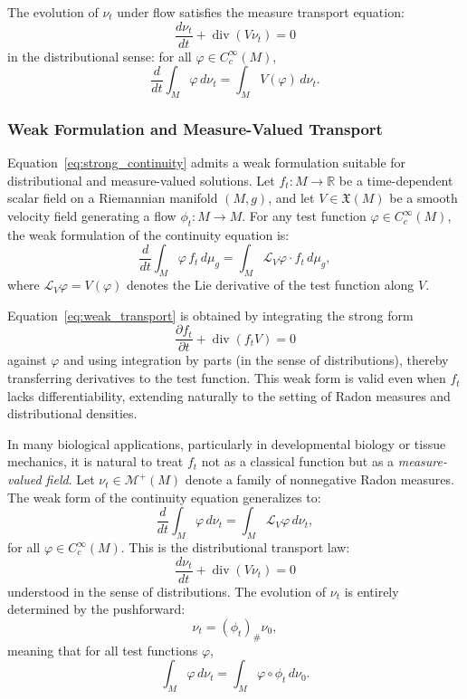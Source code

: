 \begin{definition}
The evolution of $\nu_t$ under flow satisfies the measure transport equation:
\begin{equation}
\label{eq:measure_transport_equation}
\frac{d\nu_t}{dt} + \operatorname{div}(V \nu_t) = 0
\end{equation}
in the distributional sense: for all $\varphi \in C_c^\infty(M)$,
\begin{equation}
\frac{d}{dt} \int_M \varphi \, d\nu_t = \int_M V(\varphi) \, d\nu_t.
\end{equation}
\end{definition}


\subsubsection{Weak Formulation and Measure-Valued Transport}
\label{subsec:weak_transport}

Equation~\eqref{eq:strong_continuity} admits a weak formulation suitable for distributional and measure-valued solutions. Let $f_t : M \to \mathbb{R}$ be a time-dependent scalar field on a Riemannian manifold $(M, g)$, and let $V \in \mathfrak{X}(M)$ be a smooth velocity field generating a flow $\phi_t : M \to M$. For any test function $\varphi \in C_c^\infty(M)$, the weak formulation of the continuity equation is:
\begin{equation}
\label{eq:weak_transport}
\frac{d}{dt} \int_M \varphi \, f_t \, d\mu_g = \int_M \mathcal{L}_V \varphi \cdot f_t \, d\mu_g,
\end{equation}
where $\mathcal{L}_V \varphi = V(\varphi)$ denotes the Lie derivative of the test function along $V$.

Equation~\eqref{eq:weak_transport} is obtained by integrating the strong form
\[
\frac{\partial f_t}{\partial t} + \operatorname{div}(f_t V) = 0
\]
against $\varphi$ and using integration by parts (in the sense of distributions), thereby transferring derivatives to the test function. This weak form is valid even when $f_t$ lacks differentiability, extending naturally to the setting of Radon measures and distributional densities.

In many biological applications, particularly in developmental biology or tissue mechanics, it is natural to treat $f_t$ not as a classical function but as a \emph{measure-valued field}. Let $\nu_t \in \mathcal{M}^+(M)$ denote a family of nonnegative Radon measures. The weak form of the continuity equation generalizes to:
\begin{equation}
\label{eq:measure_transport}
\frac{d}{dt} \int_M \varphi \, d\nu_t = \int_M \mathcal{L}_V \varphi \, d\nu_t,
\end{equation}
for all $\varphi \in C_c^\infty(M)$. This is the distributional transport law:
\[
\frac{d\nu_t}{dt} + \operatorname{div}(V \nu_t) = 0
\]
understood in the sense of distributions. The evolution of $\nu_t$ is entirely determined by the pushforward:
\[
\nu_t = (\phi_t)_\# \nu_0,
\]
meaning that for all test functions $\varphi$,
\[
\int_M \varphi \, d\nu_t = \int_M \varphi \circ \phi_t \, d\nu_0.
\]

